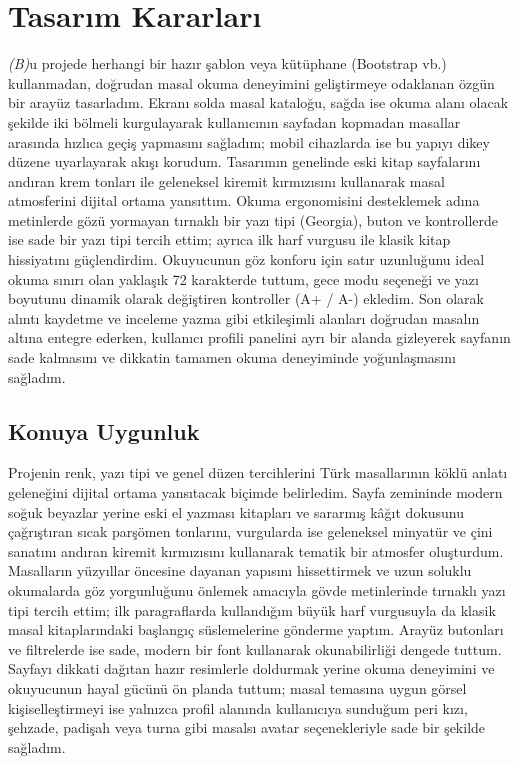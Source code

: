 \documentclass[12pt,a4paper]{article}
\newcommand{\aciklama}[1]{{\color{gray}\itshape (#1)}}
\begin{document}
\section{Tasarım Kararları}
\aciklama 
Bu projede herhangi bir hazır şablon veya kütüphane (Bootstrap vb.) kullanmadan, doğrudan masal okuma deneyimini geliştirmeye odaklanan özgün bir arayüz tasarladım. Ekranı solda masal kataloğu, sağda ise okuma alanı olacak şekilde iki bölmeli  kurgulayarak kullanıcının sayfadan kopmadan masallar arasında hızlıca geçiş yapmasını sağladım; mobil cihazlarda ise bu yapıyı dikey düzene uyarlayarak akışı korudum. Tasarımın genelinde eski kitap sayfalarını andıran krem tonları ile geleneksel kiremit kırmızısını kullanarak masal atmosferini dijital ortama yansıttım. Okuma ergonomisini desteklemek adına metinlerde gözü yormayan tırnaklı bir yazı tipi (Georgia), buton ve kontrollerde ise sade bir yazı tipi tercih ettim; ayrıca ilk harf vurgusu ile klasik kitap hissiyatını güçlendirdim. Okuyucunun göz konforu için satır uzunluğunu ideal okuma sınırı olan yaklaşık 72 karakterde tuttum, gece modu seçeneği ve yazı boyutunu dinamik olarak değiştiren kontroller (A+ / A-) ekledim. Son olarak alıntı kaydetme ve inceleme yazma gibi etkileşimli alanları doğrudan masalın altına entegre ederken, kullanıcı profili panelini ayrı bir alanda gizleyerek sayfanın sade kalmasını ve dikkatin tamamen okuma deneyiminde yoğunlaşmasını sağladım.

\subsection{Konuya Uygunluk}
Projenin renk, yazı tipi ve genel düzen tercihlerini Türk masallarının köklü anlatı geleneğini dijital ortama yansıtacak biçimde belirledim. Sayfa zemininde modern soğuk beyazlar yerine eski el yazması kitapları ve sararmış kâğıt dokusunu çağrıştıran sıcak parşömen tonlarını, vurgularda ise geleneksel minyatür ve çini sanatını andıran kiremit kırmızısını kullanarak tematik bir atmosfer oluşturdum. Masalların yüzyıllar öncesine dayanan yapısını hissettirmek ve uzun soluklu okumalarda göz yorgunluğunu önlemek amacıyla gövde metinlerinde tırnaklı yazı tipi tercih ettim; ilk paragraflarda kullandığım büyük harf vurgusuyla da klasik masal kitaplarındaki başlangıç süslemelerine gönderme yaptım. Arayüz butonları ve filtrelerde ise sade, modern bir font kullanarak okunabilirliği dengede tuttum. Sayfayı dikkati dağıtan hazır resimlerle doldurmak yerine okuma deneyimini ve okuyucunun hayal gücünü ön planda tuttum; masal temasına uygun görsel kişiselleştirmeyi ise yalnızca profil alanında kullanıcıya sunduğum peri kızı, şehzade, padişah veya turna gibi masalsı avatar seçenekleriyle sade bir şekilde sağladım.
\end{document}
